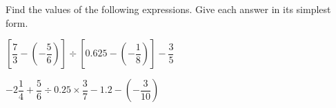  Find the values of the following expressions. Give each answer in its simplest form.

\begin{subparts}
  \item $\left[\dfrac{7}{3} - \left(-\dfrac{5}{6}\right)\right] \div \left[0.625 - \left(-\dfrac{1}{8}\right)\right] - \dfrac{3}{5}$

  \item $-2\dfrac{1}{4} + \dfrac{5}{6} \div 0.25 \times \dfrac{3}{7} - 1.2 - \left(-\dfrac{3}{10}\right)$
\end{subparts}

